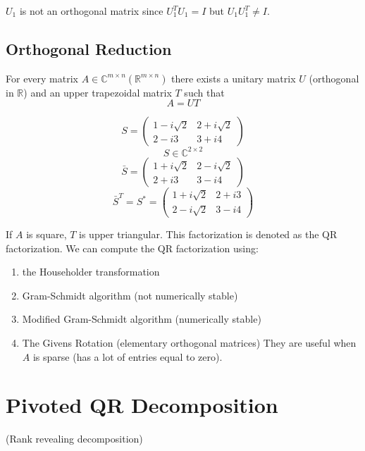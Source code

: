 $U_1$ is not an orthogonal matrix since $U_1^T U_1 = I$ but $U_1 U_1^T \neq I$.


\subsection{Orthogonal Reduction}
For every matrix $A \in \mathbb{C}^{m \times n} (\mathbb{R}^{m \times n})$ there exists a unitary matrix $U$
(orthogonal in $\mathbb{R}$) and an upper trapezoidal matrix $T$ such that
$$A = UT$$

\begin{equation*}
S = \begin{pmatrix}
1 - i\sqrt{2} & 2+i\sqrt{2} \\
2 - i3 & 3+i4
\end{pmatrix}
\end{equation*}
\begin{equation*}
S \in \mathbb{C}^{2 \times 2}
\end{equation*}
\begin{equation*}
\bar{S} = \begin{pmatrix}
1+i\sqrt{2} & 2-i\sqrt{2} \\
2+i3 & 3-i4
\end{pmatrix}
\end{equation*}
\begin{equation*}
\bar{S}^T = S^* = \begin{pmatrix}
1+i\sqrt{2} & 2+i3 \\
2-i\sqrt{2} & 3-i4
\end{pmatrix}
\end{equation*}

If $A$ is square, $T$ is upper triangular. This factorization is denoted as the QR factorization. We can compute the QR factorization using:
\begin{enumerate}
\item the Householder transformation
\item Gram-Schmidt algorithm (not numerically stable)
\item Modified Gram-Schmidt algorithm (numerically stable)
\item The Givens Rotation (elementary orthogonal matrices)
    They are useful when \( A \) is sparse (has a lot of entries equal to zero).
\end{enumerate}

\section{Pivoted QR Decomposition}
(Rank revealing decomposition)

